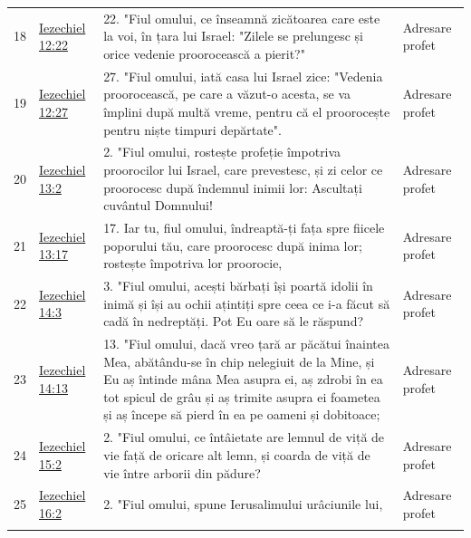 \documentclass[12pt,a4paper,twoside,openany]{book}
\begin{document}
\begin{longtable}{L{0.8cm}L{1.2cm}L{11.9cm}L{0.8cm}}
18 & \href{https://bibliaortodoxa.ro/carte.php?id=33\&cap=12\#22}{Iezechiel 12:22} & 22. "Fiul omului, ce înseamnă zicătoarea care este la voi, în țara lui Israel: "Zilele se prelungesc și orice vedenie proorocească a pierit?" & Adresare profet \\
19 & \href{https://bibliaortodoxa.ro/carte.php?id=33\&cap=12\#27}{Iezechiel 12:27} & 27. "Fiul omului, iată casa lui Israel zice: "Vedenia proorocească, pe care a văzut-o acesta, se va împlini după multă vreme, pentru că el proorocește pentru niște timpuri depărtate". & Adresare profet \\
20 & \href{https://bibliaortodoxa.ro/carte.php?id=33\&cap=13\#2}{Iezechiel 13:2} & 2. "Fiul omului, rostește profeție împotriva proorocilor lui Israel, care prevestesc, și zi celor ce proorocesc după îndemnul inimii lor: Ascultați cuvântul Domnului! & Adresare profet \\
21 & \href{https://bibliaortodoxa.ro/carte.php?id=33\&cap=13\#17}{Iezechiel 13:17} & 17. Iar tu, fiul omului, îndreaptă-ți fața spre fiicele poporului tău, care proorocesc după inima lor; rostește împotriva lor proorocie, & Adresare profet \\
22 & \href{https://bibliaortodoxa.ro/carte.php?id=33\&cap=14\#3}{Iezechiel 14:3} & 3. "Fiul omului, acești bărbați își poartă idolii în inimă și își au ochii ațintiți spre ceea ce i-a făcut să cadă în nedreptăți. Pot Eu oare să le răspund? & Adresare profet \\
23 & \href{https://bibliaortodoxa.ro/carte.php?id=33\&cap=14\#13}{Iezechiel 14:13} & 13. "Fiul omului, dacă vreo țară ar păcătui înaintea Mea, abătându-se în chip nelegiuit de la Mine, și Eu aș întinde mâna Mea asupra ei, aș zdrobi în ea tot spicul de grâu și aș trimite asupra ei foametea și aș începe să pierd în ea pe oameni și dobitoace; & Adresare profet \\
24 & \href{https://bibliaortodoxa.ro/carte.php?id=33\&cap=15\#2}{Iezechiel 15:2} & 2. "Fiul omului, ce întâietate are lemnul de viță de vie față de oricare alt lemn, și coarda de viță de vie între arborii din pădure? & Adresare profet \\
25 & \href{https://bibliaortodoxa.ro/carte.php?id=33\&cap=16\#2}{Iezechiel 16:2} & 2. "Fiul omului, spune Ierusalimului urâciunile lui, & Adresare profet \\

\end{longtable}
\end{document}
